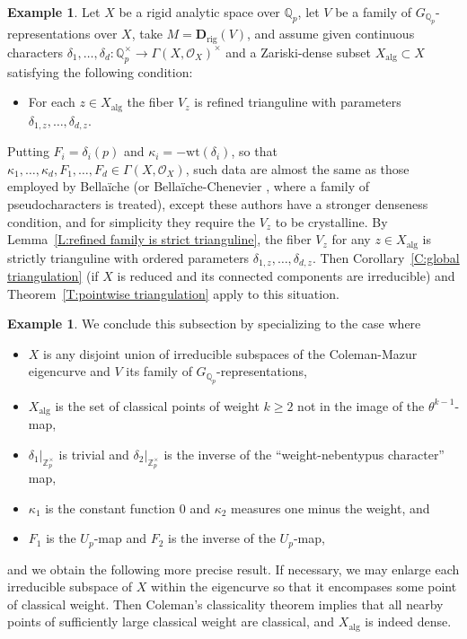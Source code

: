 \documentclass[12pt]{article}
\theoremstyle{definition}
\newtheorem{example}[theorem]{Example}
\numberwithin{equation}{theorem}
\newcommand{\calO}{\mathcal{O}}
\newcommand{\QQ}{\mathbb{Q}}
\newcommand{\ZZ}{\mathbb{Z}}
\newcommand{\bbD}{\mathbf{D}}
\newcommand{\alg}{\mathrm{alg}}
\def\Qp{\QQ_p}
\newcommand{\rig}{\mathrm{rig}}
\newcommand{\Zp}{\ZZ_p}
\begin{document}
\begin{example}\label{E:refined family}
Let $X$ be a rigid analytic space over $\Qp$,
let $V$ be a family of $G_{\Qp}$-representations over $X$,
take $M = \bbD_\rig(V)$, and assume given continuous characters
$\delta_1,\ldots,\delta_d: \Qp^\times \to \Gamma(X, \calO_X)^\times$ and a
Zariski-dense subset $X_\alg \subset X$ satisfying the following
condition:
\begin{itemize}
\item For each $z \in X_\alg$ the fiber $V_z$ is refined trianguline
  with parameters $\delta_{1,z}, \dots, \delta_{d,z}$.
\end{itemize}
Putting $F_i = \delta_i(p)$ and $\kappa_i = -\mathrm{wt}(\delta_i)$,
so that $\kappa_1,\ldots,\kappa_d,F_1,\ldots,F_d \in
\Gamma(X,\calO_X)$, such data are almost the same as those employed by
Bella\"iche \cite[3.2.1]{R:Bellaiche} (or Bella\"iche-Chenevier
\cite[Chapter~4]{R:BellaicheChenevier}, where a family of
pseudocharacters is treated), except these authors have a stronger
denseness condition, and for simplicity they require the $V_z$ to be
crystalline.  By Lemma~\ref{L:refined family is strict trianguline},
the fiber $V_z$ for any $z \in X_\alg$ is strictly trianguline with
ordered parameters $\delta_{1,z},\ldots,\delta_{d,z}$.  Then
Corollary~\ref{C:global triangulation} (if $X$ is reduced and its
connected components are irreducible) and Theorem~\ref{T:pointwise
  triangulation} apply to this situation.
\end{example}


\begin{example} \label{exa:eigencurve}
We conclude this subsection by specializing to the case where
\begin{itemize}
\item $X$ is any disjoint union of irreducible subspaces of the
  Coleman-Mazur eigencurve and $V$ its family of
  $G_{\Qp}$-representations,
\item $X_\alg$ is the set of classical points of weight $k \geq 2$ not
  in the image of the $\theta^{k-1}$-map,
\item $\delta_1|_{\Zp^\times}$ is trivial and $\delta_2|_{\Zp^\times}$
  is the inverse of the ``weight-nebentypus character'' map,
\item $\kappa_1$ is the constant function $0$ and $\kappa_2$ measures
  one minus the weight, and
\item $F_1$ is the $U_p$-map and $F_2$ is the inverse of the $U_p$-map,
\end{itemize}
and we obtain the following more precise result.  If necessary, we may
enlarge each irreducible subspace of $X$ within the eigencurve so that
it encompases some point of classical weight.  Then Coleman's
classicality theorem implies that all nearby points of sufficiently
large classical weight are classical, and $X_\alg$ is indeed dense.
\end{example}
\end{document}
